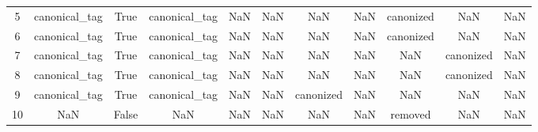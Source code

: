 \begin{table}[h!]
{\begin{tabular}{|c|c|c|c|c|c|c|c|c|c|c|}
          5 &             canonical\_tag &                              True &                canonical\_tag &                                  NaN &                                  NaN &                                  NaN &                                  NaN &                            canonized &                                  NaN &                                                NaN \\
          6 &             canonical\_tag &                              True &                canonical\_tag &                                  NaN &                                  NaN &                                  NaN &                                  NaN &                            canonized &                                  NaN &                                                NaN \\
          7 &             canonical\_tag &                              True &                canonical\_tag &                                  NaN &                                  NaN &                                  NaN &                                  NaN &                                  NaN &                            canonized &                                                NaN \\
          8 &             canonical\_tag &                              True &                canonical\_tag &                                  NaN &                                  NaN &                                  NaN &                                  NaN &                                  NaN &                            canonized &                                                NaN \\
          9 &             canonical\_tag &                              True &                canonical\_tag &                                  NaN &                                  NaN &                            canonized &                                  NaN &                                  NaN &                                  NaN &                                                NaN \\
         10 &                       NaN &                             False &                          NaN &                                  NaN &                                  NaN &                                  NaN &                                  NaN &                              removed &                                  NaN &                                                NaN \\

\end{tabular}}
\end{table}
